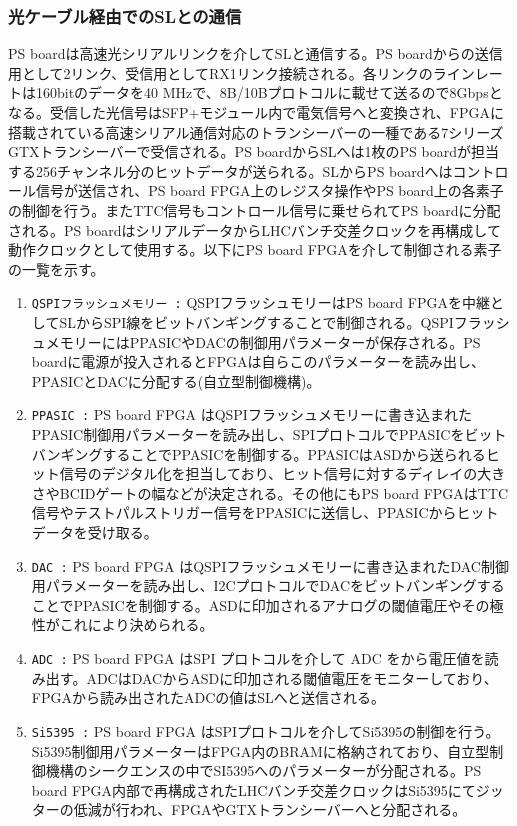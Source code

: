 \subsubsection{光ケーブル経由でのSLとの通信 } \par
PS boardは高速光シリアルリンクを介してSLと通信する。PS boardからの送信用として2リンク、受信用としてRX1リンク接続される。各リンクのラインレートは160bitのデータを40 MHzで、8B/10Bプロトコルに載せて送るので8Gbpsとなる。受信した光信号はSFP+モジュール内で電気信号へと変換され、FPGAに搭載されている高速シリアル通信対応のトランシーバーの一種である7シリーズGTXトランシーバーで受信される。PS boardからSLへは1枚のPS boardが担当する256チャンネル分のヒットデータが送られる。SLからPS boardへはコントロール信号が送信され、PS board FPGA上のレジスタ操作やPS board上の各素子の制御を行う。またTTC信号もコントロール信号に乗せられてPS boardに分配される。PS boardはシリアルデータからLHCバンチ交差クロックを再構成して動作クロックとして使用する。以下にPS board FPGAを介して制御される素子の一覧を示す。
\baselineskip

\begin{enumerate}
    \item \texttt{QSPIフラッシュメモリー :} QSPIフラッシュモリーはPS board FPGAを中継としてSLからSPI線をビットバンギングすることで制御される。QSPIフラッシュメモリーにはPPASICやDACの制御用パラメーターが保存される。PS boardに電源が投入されるとFPGAは自らこのパラメーターを読み出し、PPASICとDACに分配する(自立型制御機構)。
    \baselineskip

    \item \texttt{PPASIC :} PS board FPGA はQSPIフラッシュメモリーに書き込まれたPPASIC制御用パラメーターを読み出し、SPIプロトコルでPPASICをビットバンギングすることでPPASICを制御する。PPASICはASDから送られるヒット信号のデジタル化を担当しており、ヒット信号に対するディレイの大きさやBCIDゲートの幅などが決定される。その他にもPS board FPGAはTTC信号やテストパルストリガー信号をPPASICに送信し、PPASICからヒットデータを受け取る。
    \baselineskip        

    \item \texttt{DAC :} PS board FPGA はQSPIフラッシュメモリーに書き込まれたDAC制御用パラメーターを読み出し、I2CプロトコルでDACをビットバンギングすることでPPASICを制御する。ASDに印加されるアナログの閾値電圧やその極性がこれにより決められる。
    \baselineskip

    \item  \texttt{ADC :} PS board FPGA はSPI プロトコルを介して ADC をから電圧値を読み出す。ADCはDACからASDに印加される閾値電圧をモニターしており、FPGAから読み出されたADCの値はSLへと送信される。
    \baselineskip

    \item \texttt{Si5395 :} PS board FPGA はSPIプロトコルを介してSi5395の制御を行う。Si5395制御用パラメーターはFPGA内のBRAMに格納されており、自立型制御機構のシークエンスの中でSI5395へのパラメーターが分配される。PS board FPGA内部で再構成されたLHCバンチ交差クロックはSi5395にてジッターの低減が行われ、FPGAやGTXトランシーバーへと分配される。
    \baselineskip
\end{enumerate}

